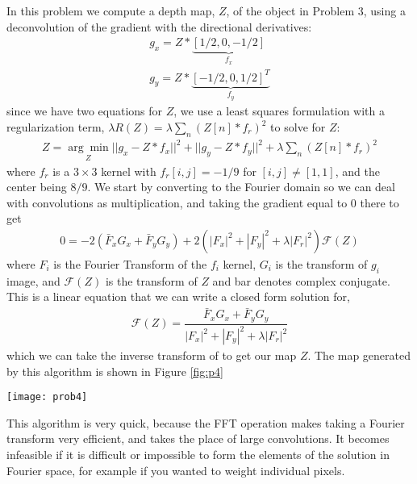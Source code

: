\documentclass{article}
\begin{document}
In this problem we compute a depth map, $Z$, of the object in Problem 3, using a deconvolution of the gradient with the directional derivatives:
\begin{align}
	g_x = Z*\underbrace{[1/2, 0, -1/2]}_{f_x}\\
	g_y = Z*\underbrace{[-1/2, 0, 1/2]^T}_{f_y}
\end{align}
since we have two equations for $Z$, we use a least squares formulation with a regularization term, $\lambda R(Z) = \lambda \sum_n (Z[n]*f_r)^2$ to solve for $Z$:
\begin{align}
	Z = \underset{Z}{\arg \min} ||g_x-Z*f_x||^2 + ||g_y-Z*f_y||^2 + \lambda \sum_n (Z[n]*f_r)^2
\end{align}
where $f_r$ is a $3\times3$ kernel with $f_r[i,j] = -1/9$ for $[i,j]\neq [1,1]$, and the center being $8/9$. We start by converting to the Fourier domain so we can deal with convolutions as multiplication, and taking the gradient equal to 0 there to get
\begin{align}
	0 = -2(\bar{F}_x G_x + \bar{F}_y G_y) + 2(|F_x|^2+|F_y|^2+\lambda|F_r|^2)\mathcal{F}(Z)
\end{align}
where $F_i$ is the Fourier Transform of the $f_i$ kernel, $G_i$ is the transform of $g_i$ image, and $\mathcal{F}(Z)$ is the transform of $Z$ and bar denotes complex conjugate. This is a linear equation that we can write a closed form solution for,
\begin{align}
	\mathcal{F}(Z)=\dfrac{\bar{F}_x G_x + \bar{F}_y G_y}{|F_x|^2+|F_y|^2+\lambda|F_r|^2}
\end{align}
which we can take the inverse transform of to get our map $Z$. The map generated by this algorithm is shown in Figure \ref{fig:p4}

\begin{figure*}[!h]
	\centering
	\texttt{[image: prob4]}
	\caption{Depth Map from Frankot-Chellappa Method}
	\label{fig:p4}
\end{figure*}

This algorithm is very quick, because the FFT operation makes taking a Fourier transform very efficient, and takes the place of large convolutions. It becomes infeasible if it is difficult or impossible to form the elements of the solution in Fourier space, for example if you wanted to weight individual pixels. 
\end{document}
